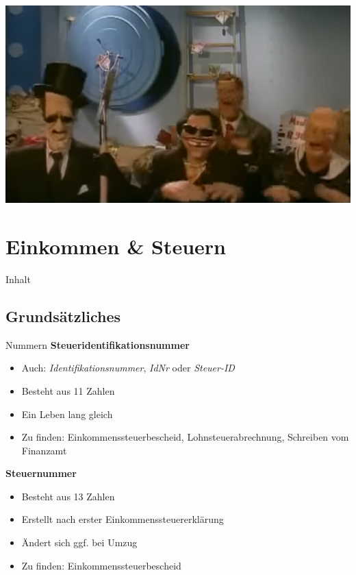 \documentclass{beamer}
\begin{document}
			\begin{frame}
				\begin{center}
					\includegraphics[height=\textheight]{images/steuersong.png}
				\end{center}
			\end{frame}
	
	\section{Einkommen \& Steuern}
	
		\begin{frame}[t]{Inhalt}
		\end{frame}
	
		\subsection{Grundsätzliches}
			
			\begin{frame}{Nummern}
				\textbf{Steueridentifikationsnummer}
				\begin{itemize}
					\item Auch: \textit{Identifikationsnummer}, \textit{IdNr} oder \textit{Steuer-ID}
					\item Besteht aus 11 Zahlen
					\item Ein Leben lang gleich
					\item Zu finden: Einkommenssteuerbescheid, Lohnsteuerabrechnung, Schreiben vom Finanzamt
				\end{itemize}
				\pause
				\textbf{Steuernummer}
				\begin{itemize}
					\item Besteht aus 13 Zahlen
					\item Erstellt nach erster Einkommenssteuererklärung
					\item Ändert sich ggf. bei Umzug
					\item Zu finden: Einkommenssteuerbescheid
				\end{itemize}
			\end{frame}
		
\end{document}
